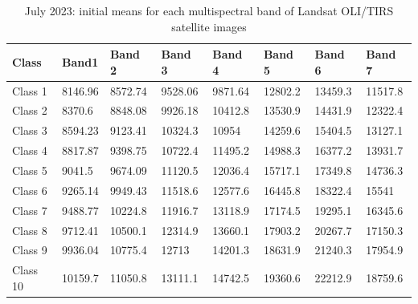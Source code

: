 \documentclass[geomatics,article,submit,pdftex,moreauthors]{Definitions/mdpi}
\begin{document}
\begin{table}[H]
\centering
\begin{tabularx}{\textwidth}{| p{1.5cm} | X | X | X | X | X | X | X | }
  \toprule
   Class & Band1 & Band 2 & Band 3 & Band 4 & Band 5 & Band 6 & Band 7  \\
   \midrule
    Class 1 & 8146.96 & 8572.74 & 9528.06 & 9871.64 & 12802.2 & 13459.3 & 11517.8 \\
    Class 2 & 8370.6 & 8848.08 & 9926.18 & 10412.8 & 13530.9 & 14431.9 & 12322.4 \\
    Class 3 & 8594.23 & 9123.41 & 10324.3 & 10954 & 14259.6 & 15404.5 & 13127.1 \\
    Class 4 & 8817.87 & 9398.75 & 10722.4 & 11495.2 & 14988.3 & 16377.2 & 13931.7 \\
    Class 5 & 9041.5 & 9674.09 & 11120.5 & 12036.4 & 15717.1 & 17349.8 & 14736.3 \\
    Class 6 & 9265.14 & 9949.43 & 11518.6 & 12577.6 & 16445.8 & 18322.4 & 15541 \\
    Class 7 & 9488.77 & 10224.8 & 11916.7 & 13118.9 & 17174.5 & 19295.1 & 16345.6 \\
    Class 8 & 9712.41 & 10500.1 & 12314.9 & 13660.1 & 17903.2 & 20267.7 & 17150.3 \\
    Class 9 & 9936.04 & 10775.4 & 12713 & 14201.3 & 18631.9 & 21240.3 & 17954.9 \\
    Class 10 & 10159.7 & 11050.8 & 13111.1 & 14742.5 & 19360.6 & 22212.9 & 18759.6 \\
    \bottomrule
\end{tabularx}
\caption{July 2023: initial means for each multispectral band of Landsat OLI/TIRS satellite images}\label{tabA04}
\end{table}
\end{document}
